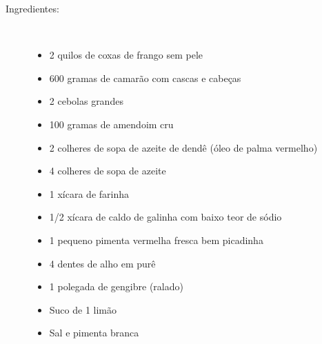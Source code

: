 \documentclass [11pt, letterpaper] {article}
\begin{document}
\begin {description}

\item [Ingredientes:] \ \\
\begin {itemize}
\item 2 quilos de coxas de frango sem pele
\item 600 gramas de camarão com cascas e cabeças
\item 2 cebolas grandes
\item 100 gramas de amendoim cru
\item 2 colheres de sopa de azeite de dend\^{e} (óleo de palma vermelho)
\item 4 colheres de sopa de azeite
\item 1 xícara de farinha
\item 1/2 xícara de caldo de galinha com baixo teor de sódio
\item 1 pequeno pimenta vermelha fresca bem picadinha
\item 4 dentes de alho em pur\^e
\item 1 polegada de gengibre (ralado)
\item Suco de 1 limão
\item Sal e pimenta branca
\end {itemize}


\end{description}
\end{document}
